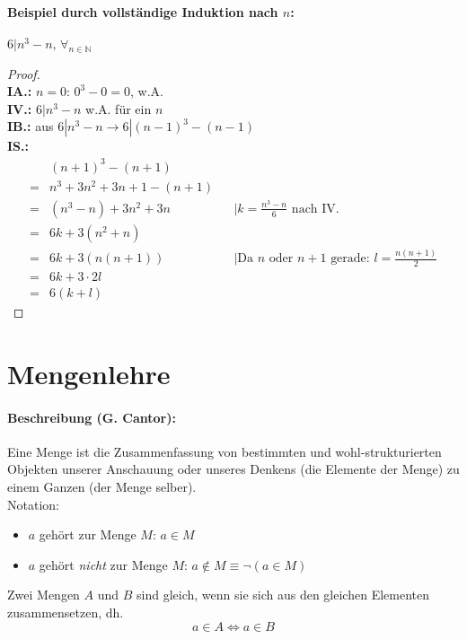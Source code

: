 \documentclass[10pt,a4paper]{article}
\begin{document}
\paragraph{Beispiel durch vollständige Induktion nach $n$:}$6|n^3 -n,\, \forall_{n\in\mathbb{N}}$\\
\begin{proof}
\ \\
\textbf{IA.:} $n=0$: $0^3-0=0$, w.A. \\
\textbf{IV.:} $6|n^3 -n$ w.A. für ein $n$ \\
\textbf{IB.:} aus $6|n^3 -n \rightarrow 6|(n-1)^3 -(n-1)$ \\
\textbf{IS.:}
\begin{align*}
&(n+1)^3 - (n+1) \\
= &n^3+3n^2+3n+1-(n+1) \\
= &(n^3-n) + 3n^2 + 3n && |k=\frac{n^3-n}{6} \text{ nach IV.}\\
= &6k +3(n^2+n) \\
= &6k + 3(n(n+1)) && |\text{Da $n$ oder $n+1$ gerade: } l=\frac{n(n+1)}{2} \\
= &6k+3\cdot 2l \\
= &6(k+l)
\end{align*}
\end{proof}

\section{Mengenlehre}
\paragraph{Beschreibung (G. Cantor):}\glqq Eine Menge ist die Zusammenfassung von bestimmten und wohl-strukturierten Objekten unserer Anschauung oder unseres Denkens
(die Elemente der Menge) zu einem Ganzen (der Menge selber).\grqq\\
Notation:
\begin{itemize}
\item $a$ gehört zur Menge $M$: $a\in M$
\item $a$ gehört \emph{nicht} zur Menge $M$: $a\notin M\equiv \neg(a\in M)$
\end{itemize}
Zwei Mengen $A$ und $B$ sind gleich, wenn sie sich aus den gleichen Elementen zusammensetzen, dh.
\[
a\in A \Leftrightarrow a\in B
\]
\end{document}
